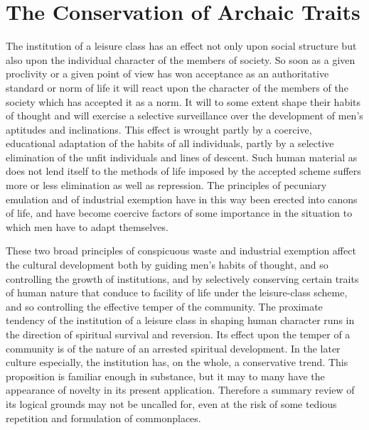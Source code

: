 \documentclass[12pt]{report}
\begin{document}
\chapter{The Conservation of Archaic Traits}
The institution of a leisure class has an effect not only upon social
structure but also upon the individual character of the members of
society. So soon as a given proclivity or a given point of view has won
acceptance as an authoritative standard or norm of life it will react
upon the character of the members of the society which has accepted it
as a norm. It will to some extent shape their habits of thought and
will exercise a selective surveillance over the development of men's
aptitudes and inclinations. This effect is wrought partly by a coercive,
educational adaptation of the habits of all individuals, partly by a
selective elimination of the unfit individuals and lines of descent.
Such human material as does not lend itself to the methods of life
imposed by the accepted scheme suffers more or less elimination as well
as repression. The principles of pecuniary emulation and of industrial
exemption have in this way been erected into canons of life, and have
become coercive factors of some importance in the situation to which men
have to adapt themselves.

These two broad principles of conspicuous waste and industrial exemption
affect the cultural development both by guiding men's habits of thought,
and so controlling the growth of institutions, and by selectively
conserving certain traits of human nature that conduce to facility of
life under the leisure-class scheme, and so controlling the effective
temper of the community. The proximate tendency of the institution of
a leisure class in shaping human character runs in the direction of
spiritual survival and reversion. Its effect upon the temper of a
community is of the nature of an arrested spiritual development. In
the later culture especially, the institution has, on the whole, a
conservative trend. This proposition is familiar enough in substance,
but it may to many have the appearance of novelty in its present
application. Therefore a summary review of its logical grounds may
not be uncalled for, even at the risk of some tedious repetition and
formulation of commonplaces.
\end{document}

